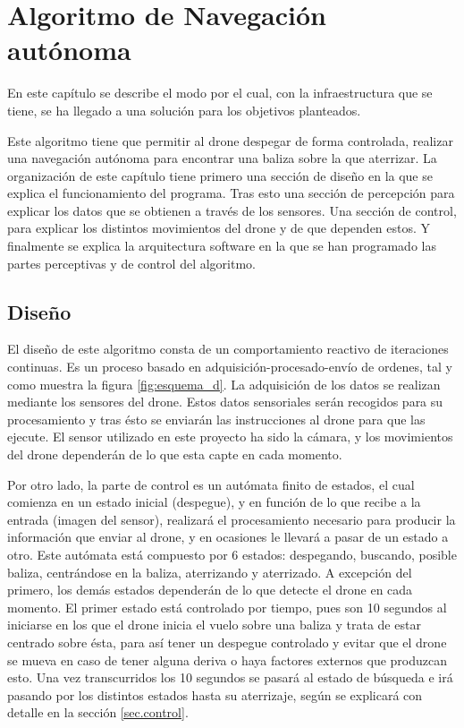 \chapter{Algoritmo de Navegaci\'on aut\'onoma}\label{cap.algoritmo} %

\hspace{1 cm} En este cap\'itulo se describe el modo por el cual, con la infraestructura que se tiene, se ha llegado a una soluci\'on para los objetivos planteados. 

\hspace{1 cm} Este algoritmo tiene que permitir al drone despegar de forma controlada, realizar una navegaci\'on aut\'onoma para encontrar una baliza sobre la que aterrizar. La organizaci\'on de este cap\'itulo tiene primero una secci\'on de diseño en la que se explica el funcionamiento del programa. Tras esto una secci\'on de percepci\'on para explicar los datos que se obtienen a trav\'es de los sensores. Una secci\'on de control, para explicar los distintos movimientos del drone y de que dependen estos. Y finalmente se explica la arquitectura software en la que se han programado las partes perceptivas y de control del algoritmo.

\section{Diseño}
\label{sec.Design}

\hspace{1 cm} El diseño de este algoritmo consta de un comportamiento reactivo de iteraciones continuas. Es un proceso basado en adquisici\'on-procesado-env\'io de ordenes, tal y como muestra la figura \ref{fig:esquema_d}. La adquisici\'on de los datos se realizan mediante los sensores del drone. Estos datos sensoriales ser\'an recogidos para su procesamiento y tras \'esto se enviar\'an las instrucciones al drone para que las ejecute. El sensor utilizado en este proyecto ha sido la c\'amara, y los movimientos del drone depender\'an de lo que esta capte en cada momento. 

\hspace{1 cm} Por otro lado, la parte de control es un aut\'omata finito de estados, el cual comienza en un estado inicial (despegue), y en funci\'on de lo que recibe a la entrada (imagen del sensor), realizar\'a el procesamiento necesario para producir la informaci\'on que enviar al drone, y en ocasiones le llevar\'a a pasar de un estado a otro. Este aut\'omata est\'a compuesto por 6 estados: despegando, buscando, posible baliza, centr\'andose en la baliza, aterrizando y aterrizado. A excepci\'on del primero, los dem\'as estados depender\'an de lo que detecte el drone en cada momento. El primer estado est\'a controlado por tiempo, pues son 10 segundos al iniciarse en los que el drone inicia el vuelo sobre una baliza y trata de estar centrado sobre \'esta, para as\'i tener un despegue controlado y evitar que el drone se mueva en caso de tener alguna deriva o haya factores externos que produzcan esto. Una vez transcurridos los 10 segundos se pasar\'a al estado de b\'usqueda e ir\'a pasando por los distintos estados hasta su aterrizaje, seg\'un se explicar\'a con detalle en la secci\'on \ref{sec.control}. 

